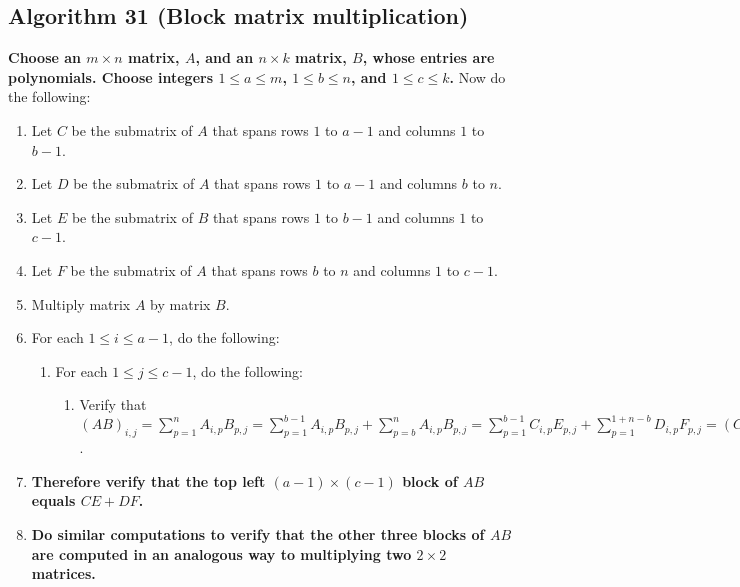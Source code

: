 \documentclass[twocolumn]{article}
\begin{document}
		\subsection{Algorithm 31 (Block matrix multiplication)}\label{sec:algorithm 31}
			\textbf{Choose an $m\times n$ matrix, $A$, and an $n\times k$ matrix, $B$, whose entries are polynomials. Choose integers $1\le a\le m$, $1\le b\le n$, and $1\le c\le k$.} Now do the following:
			\begin{enumerate}
				\item Let $C$ be the submatrix of $A$ that spans rows $1$ to $a-1$ and columns $1$ to $b-1$.
				\item Let $D$ be the submatrix of $A$ that spans rows $1$ to $a-1$ and columns $b$ to $n$.
				\item Let $E$ be the submatrix of $B$ that spans rows $1$ to $b-1$ and columns $1$ to $c-1$.
				\item Let $F$ be the submatrix of $A$ that spans rows $b$ to $n$ and columns $1$ to $c-1$.
				\item Multiply matrix $A$ by matrix $B$.
				\item For each $1\le i\le a-1$, do the following:
				\begin{enumerate}
					\item For each $1\le j\le c-1$, do the following:
						\begin{enumerate}
							\item Verify that $(AB)_{i,j}=\sum_{p=1}^n A_{i,p}B_{p,j}=\sum_{p=1}^{b-1} A_{i,p}B_{p,j}+\sum_{p=b}^n A_{i,p}B_{p,j}=\sum_{p=1}^{b-1} C_{i,p}E_{p,j}+\sum_{p=1}^{1+n-b} D_{i,p}F_{p,j}=(CE)_{i,j}+(DF)_{i,j}$.
						\end{enumerate}
				\end{enumerate}
				\item \textbf{Therefore verify that the top left $(a-1)\times(c-1)$ block of $AB$ equals $CE+DF$.}
				\item \textbf{Do similar computations to verify that the other three blocks of $AB$ are computed in an analogous way to multiplying two $2\times 2$ matrices.}
			\end{enumerate}
\end{document}
